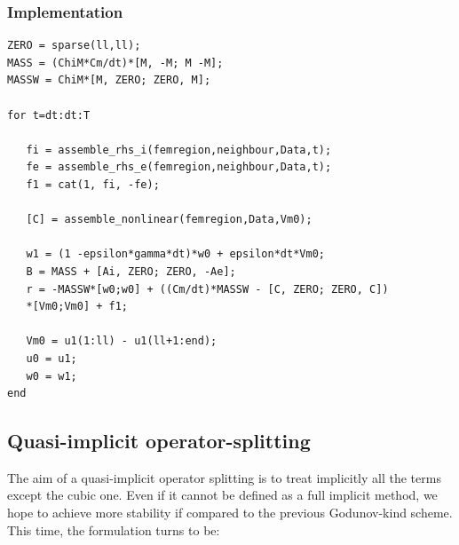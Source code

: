 \documentclass[a4paper,11pt]{article}
\begin{document}
\subsubsection{Implementation}
\begin{verbatim}
ZERO = sparse(ll,ll);
MASS = (ChiM*Cm/dt)*[M, -M; M -M];
MASSW = ChiM*[M, ZERO; ZERO, M];

for t=dt:dt:T

   fi = assemble_rhs_i(femregion,neighbour,Data,t);
   fe = assemble_rhs_e(femregion,neighbour,Data,t);
   f1 = cat(1, fi, -fe);

   [C] = assemble_nonlinear(femregion,Data,Vm0);

   w1 = (1 -epsilon*gamma*dt)*w0 + epsilon*dt*Vm0;
   B = MASS + [Ai, ZERO; ZERO, -Ae];
   r = -MASSW*[w0;w0] + ((Cm/dt)*MASSW - [C, ZERO; ZERO, C])
   *[Vm0;Vm0] + f1;

   Vm0 = u1(1:ll) - u1(ll+1:end);
   u0 = u1;
   w0 = w1;
end
\end{verbatim}
\vspace{4mm}
\subsection{Quasi-implicit operator-splitting}
The aim of a quasi-implicit operator splitting is to treat implicitly all the terms except the cubic one. Even if it cannot be defined as a full implicit method, we hope to achieve more stability if compared to the previous Godunov-kind scheme. This time, the formulation turns to be: \newline
\end{document}
